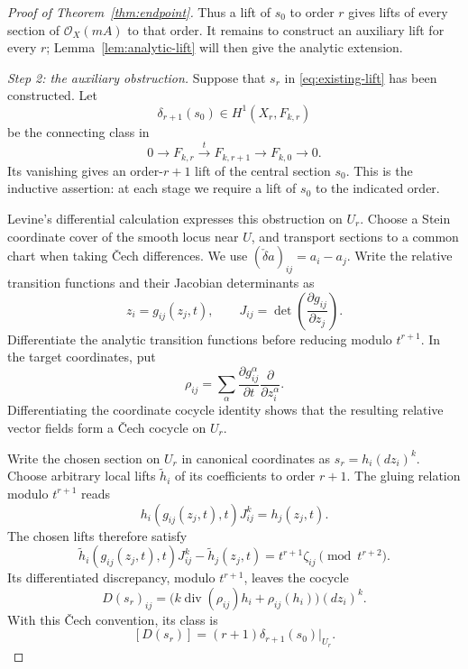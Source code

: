 \documentclass[11pt,a4paper]{article}
\numberwithin{equation}{section}
\theoremstyle{definition}
\theoremstyle{remark}
\newcommand{\OO}{\mathcal O}\newcommand{\cX}{\mathcal X}
\begin{document}
\begin{proof}[Proof of Theorem~\ref{thm:endpoint}]
Thus a lift of $s_0$ to order $r$ gives lifts of every section of
$\OO_X(mA)$ to that order. It remains to construct an auxiliary lift
for every $r$; Lemma~\ref{lem:analytic-lift} will then give the
analytic extension.

\smallskip\noindent\emph{Step 2: the auxiliary obstruction.}
Suppose that $s_r$ in \eqref{eq:existing-lift} has been constructed.
Let
\[
 \delta_{r+1}(s_0)\in H^1(X_r,F_{k,r})
\]
be the connecting class in
\begin{equation}\label{eq:aux-obstruction-sequence}
 0\longrightarrow F_{k,r}\xrightarrow{\ t\ }F_{k,r+1}
 \longrightarrow F_{k,0}\longrightarrow0.
\end{equation}
Its vanishing gives an order-$r+1$ lift of the central section $s_0$.
This is the inductive assertion: at each stage we require a lift of
$s_0$ to the indicated order.

Levine's differential calculation
\cite[Lemmas~1.2--1.5]{Levine1983} expresses this obstruction on $U_r$.
Choose a Stein coordinate cover of the smooth locus near $U$, and
transport sections to a common chart when taking Čech differences.
We use $(\check\delta a)_{ij}=a_i-a_j$. Write the relative transition
functions and their Jacobian determinants as
\[
 z_i=g_{ij}(z_j,t),\qquad
 J_{ij}=\det\left(\frac{\partial g_{ij}}{\partial z_j}\right).
\]
Differentiate the analytic transition functions before reducing
modulo $t^{r+1}$. In the target coordinates, put
\begin{equation}\label{eq:rho}
 \rho_{ij}=\sum_\alpha
 \frac{\partial g_{ij}^{\alpha}}{\partial t}
 \frac{\partial}{\partial z_i^\alpha}.
\end{equation}
Differentiating the coordinate cocycle identity shows that the resulting
relative vector fields form a Čech cocycle on $U_r$.

Write the chosen section on $U_r$ in canonical coordinates as
$s_r=h_i(dz_i)^k$. Choose arbitrary local lifts $\widetilde h_i$ of
its coefficients to order $r+1$. The gluing relation modulo $t^{r+1}$ reads
\[
 h_i(g_{ij}(z_j,t),t)J_{ij}^{k}=h_j(z_j,t).
\]
The chosen lifts therefore satisfy
\[
 \widetilde h_i(g_{ij}(z_j,t),t)J_{ij}^{k}-\widetilde h_j(z_j,t)
 =t^{r+1}\zeta_{ij}\pmod{t^{r+2}}.
\]
Its differentiated discrepancy, modulo $t^{r+1}$, leaves the cocycle
\begin{equation}\label{eq:levine-cocycle}
 D(s_r)_{ij}
 =\bigl(k\operatorname{div}(\rho_{ij})h_i
                  +\rho_{ij}(h_i)\bigr)(dz_i)^k.
\end{equation}
With this Čech convention, its class is
\begin{equation}\label{eq:levine-obstruction}
 [D(s_r)]=(r+1)\delta_{r+1}(s_0)|_{U_r}.
\end{equation}


\end{proof}
\end{document}
